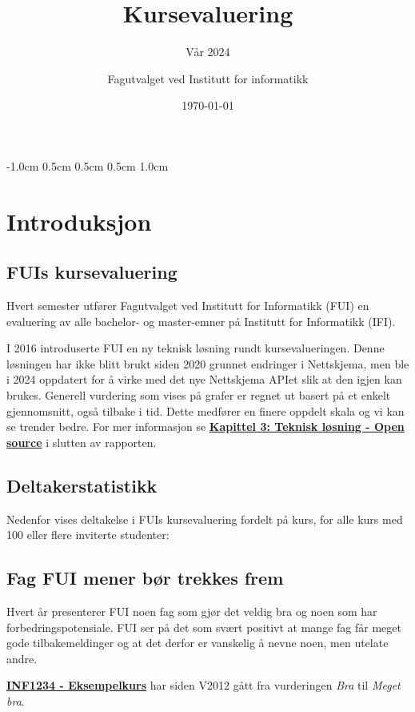 \documentclass[norsk,a4paper,11pt]{report}
\author{Fagutvalget ved Institutt for informatikk}
\title{Kursevaluering}
\subtitle{Vår 2024}
\date{\today}
\begin{document}
\ififorside{}

\setlength{\topmargin}      {-1.0cm}
\setlength{\headsep}        {0.5cm}
\setlength{\oddsidemargin}  {0.5cm}
\setlength{\evensidemargin} {0.5cm}
\setlength{\footskip}       {1.0cm}
\renewcommand{\thesection}{}
\renewcommand{\thesubsection}{}
\tableofcontents
\newpage
\chapter{Introduksjon}
\label{chp:intro}
\section{FUIs kursevaluering}
Hvert semester utfører Fagutvalget ved Institutt for Informatikk (FUI) en evaluering av alle bachelor- og master-emner på Institutt for Informatikk (IFI).

I 2016 introduserte FUI en ny teknisk løsning rundt kursevalueringen. Denne løsningen har ikke blitt brukt siden 2020 grunnet endringer i Nettskjema, men ble i 2024 oppdatert for å virke med det nye Nettskjema APIet slik at den igjen kan brukes.
Generell vurdering som vises på grafer er regnet ut basert på et enkelt gjennomsnitt, også tilbake i tid.
Dette medfører en finere oppdelt skala og vi kan se trender bedre.
For mer informasjon se \textbf{\hyperref[sec:OS]{Kapittel 3: Teknisk løsning - Open source}} i slutten av rapporten.

\section{Deltakerstatistikk}
Nedenfor vises deltakelse i FUIs kursevaluering fordelt på kurs, for alle kurs med 100 eller flere inviterte studenter:


\section{Fag FUI mener bør trekkes frem}
Hvert år presenterer FUI noen fag som gjør det veldig bra og noen som har forbedringspotensiale.
FUI ser på det som svært positivt at mange fag får meget gode tilbakemeldinger og at det derfor er vanskelig å nevne noen, men utelate andre.

\hyperref[course:INF1234]{\textbf{INF1234 - Eksempelkurs}} har siden V2012 gått fra vurderingen  \emph{Bra} til \emph{Meget bra}.
\end{document}
